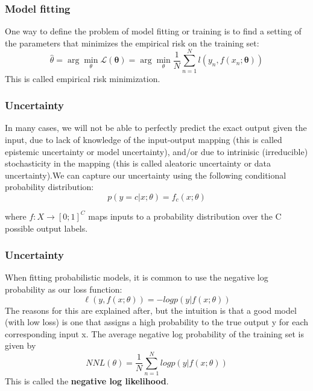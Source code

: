 \documentclass[spanish]{beamer}
\begin{document}
\begin{frame}
\frametitle{Model fitting}
One way to define the problem of model fitting or training is to find a setting of the parameters
that minimizes the empirical risk on the training set:
\begin{equation*}
\hat{\theta} =  \arg\min_{\theta} \mathcal{L}(\mathbf{\theta})  =\arg\min_{\theta} \frac{1}{N} \sum_{n=1}^{N}{l(y_{n}, f(x_{n};\mathbf{\theta})) }
\end{equation*}
This is called empirical risk minimization.
\end{frame}

\begin{frame}
\frametitle{Uncertainty}
In many cases, we will not be able to perfectly predict the exact output given the input, due to
lack of knowledge of the input-output mapping (this is called epistemic uncertainty or model
uncertainty), and/or due to intrinisic (irreducible) stochasticity in the mapping (this is called
aleatoric uncertainty or data uncertainty).We can capture our uncertainty using the following conditional
probability distribution:
%
\begin{equation*}
p(y=c\vert x ; \theta)=f_{c}(x; \theta)
\end{equation*}


where $f:X\rightarrow [0; 1]^C$ maps inputs to a probability distribution over the C possible output labels.
\end{frame}

\begin{frame}
\frametitle{Uncertainty}
When fitting probabilistic models, it is common to use the negative log probability as our loss
function:
\begin{equation*}
\ell(y,f(x;\theta))= -log p(y\vert f(x;\theta) )
\end{equation*}
The reasons for this are explained after, but the intuition is that a good model (with low
loss) is one that assigns a high probability to the true output y for each corresponding input x. The
average negative log probability of the training set is given by
\begin{equation*}
NNL(\theta)= \frac{1}{N}\sum_{n=1}^{N} log p(y\vert f(x;\theta) )
\end{equation*}
This is called the \textbf{negative log likelihood}.
\end{frame}
\end{document}

